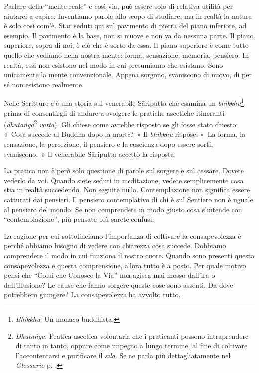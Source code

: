 Parlare della ``mente reale'' e così via, può essere solo di relativa
utilità per aiutarci a capire. Inventiamo parole allo scopo di studiare,
ma in realtà la natura è solo così com'è. Star seduti qui sul pavimento
di pietra del piano inferiore, ad esempio. Il pavimento è la base, non
si muove e non va da nessuna parte. Il piano superiore, sopra di noi, è
ciò che è sorto da essa. Il piano superiore è come tutto quello che
vediamo nella nostra mente: forma, sensazione, memoria, pensiero. In
realtà, essi non esistono nel modo in cui presumiamo che esistano. Sono
unicamente la mente convenzionale. Appena sorgono, svaniscono di nuovo,
di per sé non esistono realmente.

Nelle Scritture c'è una storia sul venerabile Sāriputta che esamina un
\emph{bhikkhu}\footnote{\emph{Bhikkhu}: Un monaco buddhista.} prima di
consentirgli di andare a svolgere le pratiche ascetiche itineranti
(\emph{dhutaṅga}\footnote{\emph{Dhutaṅga}: Pratica ascetica volontaria
  che i praticanti possono intraprendere di tanto in tanto, oppure come
  impegno a lungo termine, al fine di coltivare l'accontentarsi e
  purificare il \emph{sīla}. Se ne parla più dettagliatamente nel
  \emph{Glossario} p. \pageref{glossary-dhutanga}.} \emph{vaṭṭa}). Gli chiese come avrebbe risposto se
gli fosse stato chiesto: «~Cosa succede al Buddha dopo la morte?~» Il
\emph{bhikkhu} rispose: «~La forma, la sensazione, la percezione, il
pensiero e la coscienza dopo essere sorti, svaniscono.~» Il venerabile
Sāriputta accettò la risposta.

La pratica non è però solo questione di parole sul sorgere e sul
cessare. Dovete vederlo da voi. Quando siete seduti in meditazione,
vedete semplicemente cosa stia in realtà succedendo. Non seguite nulla.
Contemplazione non significa essere catturati dai pensieri. Il pensiero
contemplativo di chi è sul Sentiero non è uguale al pensiero del mondo.
Se non comprendete in modo giusto cosa s'intende con ``contemplazione'',
più pensate più sarete confusi.

La ragione per cui sottolineiamo l'importanza di coltivare la
consapevolezza è perché abbiamo bisogno di vedere con chiarezza cosa
succede. Dobbiamo comprendere il modo in cui funziona il nostro cuore.
Quando sono presenti questa consapevolezza e questa comprensione, allora
tutto è a posto. Per quale motivo pensi che ``Colui che Conosce la Via''
non agisca mai mosso dall'ira o dall'illusione? Le cause che fanno
sorgere queste cose sono assenti. Da dove potrebbero giungere? La
consapevolezza ha avvolto tutto.

